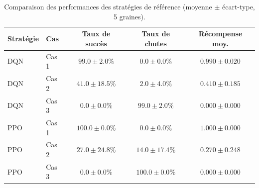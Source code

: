 \begin{table}[H]
\centering
\caption{Comparaison des performances des stratégies de référence (moyenne $\pm$ écart-type, 5 graines).}
\label{tab:baseline_results}
\small
\begin{tabular}{llccc}
\toprule
Stratégie & Cas & Taux de succès & Taux de chutes & Récompense moy. \\
\midrule
DQN & Cas 1 & $99.0 \pm 2.0\%$ & $0.0 \pm 0.0\%$ & $0.990 \pm 0.020$ \\
DQN & Cas 2 & $41.0 \pm 18.5\%$ & $2.0 \pm 4.0\%$ & $0.410 \pm 0.185$ \\
DQN & Cas 3 & $0.0 \pm 0.0\%$ & $99.0 \pm 2.0\%$ & $0.000 \pm 0.000$ \\
\midrule
PPO & Cas 1 & $100.0 \pm 0.0\%$ & $0.0 \pm 0.0\%$ & $1.000 \pm 0.000$ \\
PPO & Cas 2 & $27.0 \pm 24.8\%$ & $14.0 \pm 17.4\%$ & $0.270 \pm 0.248$ \\
PPO & Cas 3 & $0.0 \pm 0.0\%$ & $100.0 \pm 0.0\%$ & $0.000 \pm 0.000$ \\
\bottomrule
\end{tabular}
\end{table}
